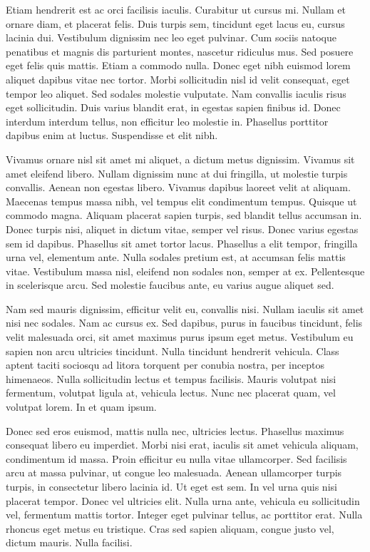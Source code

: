 Etiam hendrerit est ac orci facilisis iaculis. Curabitur ut cursus mi. Nullam et ornare diam, et placerat felis. Duis
turpis sem, tincidunt eget lacus eu, cursus lacinia dui. Vestibulum dignissim nec leo eget pulvinar. Cum sociis natoque
penatibus et magnis dis parturient montes, nascetur ridiculus mus. Sed posuere eget felis quis mattis. Etiam a commodo
nulla. Donec eget nibh euismod lorem aliquet dapibus vitae nec tortor. Morbi sollicitudin nisl id velit consequat, eget
tempor leo aliquet. Sed sodales molestie vulputate. Nam convallis iaculis risus eget sollicitudin. Duis varius blandit
erat, in egestas sapien finibus id. Donec interdum interdum tellus, non efficitur leo molestie in. Phasellus porttitor
dapibus enim at luctus. Suspendisse et elit nibh.

Vivamus ornare nisl sit amet mi aliquet, a dictum metus dignissim. Vivamus sit amet eleifend libero. Nullam dignissim
nunc at dui fringilla, ut molestie turpis convallis. Aenean non egestas libero. Vivamus dapibus laoreet velit at
aliquam. Maecenas tempus massa nibh, vel tempus elit condimentum tempus. Quisque ut commodo magna. Aliquam placerat
sapien turpis, sed blandit tellus accumsan in. Donec turpis nisi, aliquet in dictum vitae, semper vel risus. Donec
varius egestas sem id dapibus. Phasellus sit amet tortor lacus. Phasellus a elit tempor, fringilla urna vel, elementum
ante. Nulla sodales pretium est, at accumsan felis mattis vitae. Vestibulum massa nisl, eleifend non sodales non, semper
at ex. Pellentesque in scelerisque arcu. Sed molestie faucibus ante, eu varius augue aliquet sed.

Nam sed mauris dignissim, efficitur velit eu, convallis nisi. Nullam iaculis sit amet nisi nec sodales. Nam ac cursus
ex. Sed dapibus, purus in faucibus tincidunt, felis velit malesuada orci, sit amet maximus purus ipsum eget metus.
Vestibulum eu sapien non arcu ultricies tincidunt. Nulla tincidunt hendrerit vehicula. Class aptent taciti sociosqu ad
litora torquent per conubia nostra, per inceptos himenaeos. Nulla sollicitudin lectus et tempus facilisis. Mauris
volutpat nisi fermentum, volutpat ligula at, vehicula lectus. Nunc nec placerat quam, vel volutpat lorem. In et quam
ipsum.

Donec sed eros euismod, mattis nulla nec, ultricies lectus. Phasellus maximus consequat libero eu imperdiet. Morbi nisi
erat, iaculis sit amet vehicula aliquam, condimentum id massa. Proin efficitur eu nulla vitae ullamcorper. Sed facilisis
arcu at massa pulvinar, ut congue leo malesuada. Aenean ullamcorper turpis turpis, in consectetur libero lacinia id. Ut
eget est sem. In vel urna quis nisi placerat tempor. Donec vel ultricies elit. Nulla urna ante, vehicula eu sollicitudin
vel, fermentum mattis tortor. Integer eget pulvinar tellus, ac porttitor erat. Nulla rhoncus eget metus eu tristique.
Cras sed sapien aliquam, congue justo vel, dictum mauris. Nulla facilisi.

